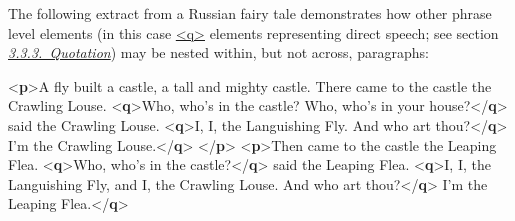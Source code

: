The following extract from a Russian fairy tale demonstrates how other phrase level elements (in this case \hyperref[TEI.q]{<q>} elements representing direct speech; see section \textit{\hyperref[COHQQ]{3.3.3.\ Quotation}}) may be nested within, but not across, paragraphs: \par\bgroup{}\exampleFont \begin{shaded}\noindent\mbox{}{<\textbf{p}>}A fly built a castle, a tall and mighty castle.\mbox{}\newline 
 There came to the castle the Crawling Louse. {<\textbf{q}>}Who,\mbox{}\newline 
\hspace*{1em}\hspace*{1em} who's in the castle? Who, who's in your house?{</\textbf{q}>}\mbox{}\newline 
 said the Crawling Louse. {<\textbf{q}>}I, I, the Languishing Fly.\mbox{}\newline 
\hspace*{1em}\hspace*{1em} And who art thou?{</\textbf{q}>}\mbox{}\newline 
{}I'm the Crawling Louse.{</\textbf{q}>}\mbox{}\newline 
{</\textbf{p}>}\mbox{}\newline 
{<\textbf{p}>}Then came to the castle the Leaping Flea. {<\textbf{q}>}Who,\mbox{}\newline 
\hspace*{1em}\hspace*{1em} who's in the castle?{</\textbf{q}>} said the Leaping Flea. {<\textbf{q}>}I,\mbox{}\newline 
\hspace*{1em}\hspace*{1em} I, the Languishing Fly, and I, the Crawling Louse. And\mbox{}\newline 
\hspace*{1em}\hspace*{1em} who art thou?{</\textbf{q}>}\mbox{}\newline 
{}I'm the Leaping Flea.{</\textbf{q}>}\mbox{}\newline 

\end{shaded}

